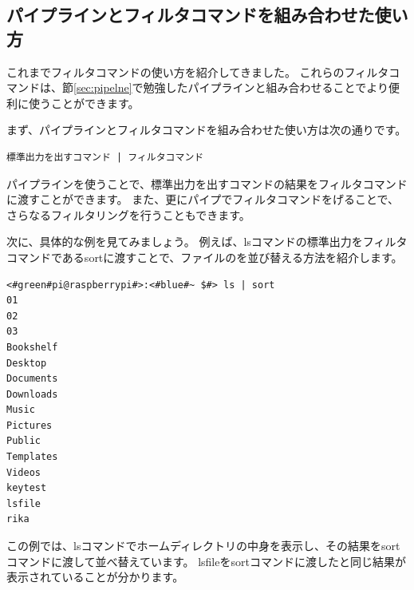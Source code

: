\documentclass[text03.tex]{subfiles}
\begin{document}
\subsection{パイプラインとフィルタコマンドを組み合わせた使い方}
これまでフィルタコマンドの使い方を紹介してきました。
これらのフィルタコマンドは、節\ref{sec:pipelne}で勉強したパイプラインと組み合わせることでより便利に使うことができます。

まず、パイプラインとフィルタコマンドを組み合わせた使い方は次の通りです。

\begin{lstlisting}[caption=パイプラインを用いたフィルタコマンドの実行例, label=pipeline_filter]
標準出力を出すコマンド | フィルタコマンド
\end{lstlisting}

パイプラインを使うことで、標準出力を出すコマンドの結果をフィルタコマンドに渡すことができます。
また、更にパイプでフィルタコマンドをげることで、さらなるフィルタリングを行うこともできます。

次に、具体的な例を見てみましょう。
例えば、lsコマンドの標準出力をフィルタコマンドであるsortに渡すことで、ファイルのを並び替える方法を紹介します。

\begin{lstlisting}[caption=パイプラインを用いたsortコマンドの実行例, label=sort_example]
<#green#pi@raspberrypi#>:<#blue#~ $#> ls | sort
01
02
03
Bookshelf
Desktop
Documents
Downloads
Music
Pictures
Public
Templates
Videos
keytest
lsfile
rika
\end{lstlisting}

この例では、lsコマンドでホームディレクトリの中身を表示し、その結果をsortコマンドに渡して並べ替えています。
lsfileをsortコマンドに渡したと同じ結果が表示されていることが分かります。
\end{document}

